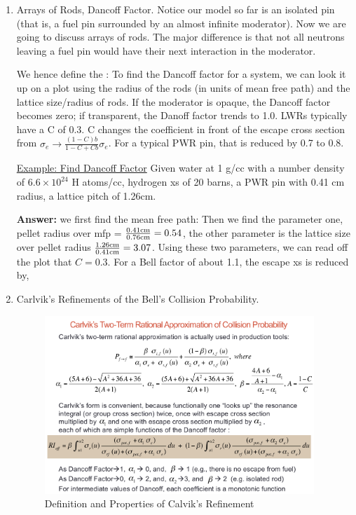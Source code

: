 \documentclass{school-22.211-notes}
\begin{document}
\begin{enumerate}
\item Arrays of Rods, Dancoff Factor.
Notice our model so far is an isolated pin (that is, a fuel pin surrounded by an almost infinite moderator). Now we are going to discuss arrays of rods. The major difference is that not all neutrons leaving a fuel pin would have their next interaction in the moderator. 

We hence define the :
To find the Dancoff factor for a system, we can look it up on a plot using the radius of the rods (in units of mean free path) and the lattice size/radius of rods. If the moderator is opaque, the Dancoff factor becomes zero; if transparent, the Danoff factor trends to 1.0. LWRs typically have a C of 0.3. 
C changes the coefficient in front of the escape cross section from $\sigma_e \to \frac{(1-C)b}{1-C + Cb} \sigma_e$. For a typical PWR pin, that is reduced by 0.7 to 0.8.

\uline{Example: Find Dancoff Factor} Given water at 1 g/cc with a number density of $6.6 \times 10^{24}$ H atoms/cc, hydrogen xs of 20 barns, a PWR pin with 0.41 cm radius, a lattice pitch of 1.26cm. 

\textbf{Answer:} we first find the mean free path: 
Then we find the parameter one, pellet radius over mfp = $\frac{0.41 \mathrm{cm}}{0.76 \mathrm{cm}}  = 0.54$, the other parameter is the lattice size over pellet radius $\frac{1.26 \mathrm{cm}}{0.41 \mathrm{cm}} = 3.07$. Using these two parameters, we can read off the plot that $C = 0.3$. For a Bell factor of about 1.1, the escape xs is reduced by,

\item Carlvik's Refinements of the Bell's Collision Probability.
\begin{figure}
  \centering
  \includegraphics[width=4in]{images/r-m/Carlvik-refinement.png}
  \caption{Definition and Properties of Calvik's Refinement} \label{Calvik}
\end{figure}


\end{enumerate}
\end{document}
